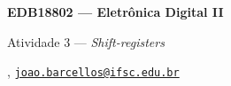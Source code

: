 



\usepackage[style=numeric, citestyle=ieee]{biblatex}




\begin{Large}
    \textbf{EDB18802 --- Eletrônica Digital II}
    
    Atividade 3 --- \textit{Shift-registers} \hfill {}
\end{Large}

\vspace{1ex}
\textbf{} , \href{mailto:joao.barcellos@ifsc.edu.br}{\texttt{joao.barcellos@ifsc.edu.br}}\\
\textbf{}

\vspace{2ex}


